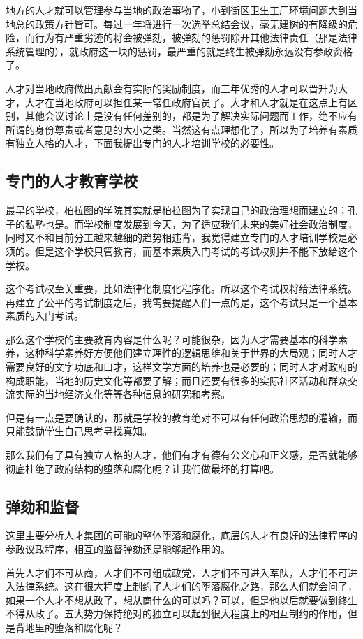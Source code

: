 \documentclass[11pt,oneside]{article}
\begin{document}
地方的人才就可以管理参与当地的政治事物了，小到街区卫生工厂环境问题大到当地总的政策方针皆可。每过一年将进行一次选举总结会议，毫无建树的有降级的危险，而行为有严重劣迹的将会被弹劾，被弹劾的惩罚除开其他法律责任（那是法律系统管理的），就政府这一块的惩罚，最严重的就是终生被弹劾永远没有参政资格了。

人才对当地政府做出贡献会有实际的奖励制度，而三年优秀的人才可以晋升为大才，大才在当地政府可以担任某一常任政府官员了。大才和人才就是在这点上有区别，其他会议讨论上是没有任何差别的，都是为了解决实际问题而工作，绝不应有所谓的身份尊贵或者意见的大小之类。当然这有点理想化了，所以为了培养有素质有独立人格的人才，下面我提出专门的人才培训学校的必要性。

\subsection{专门的人才教育学校}
\label{sec-3-1}
最早的学校，柏拉图的学院其实就是柏拉图为了实现自己的政治理想而建立的；孔子的私塾也是。而学校制度发展到今天，为了适应我们未来的美好社会政治制度，同时又不和目前分工越来越细的趋势相违背，我觉得建立专门的人才培训学校是必须的。但是这个学校只管教育，而基本素质入门考试的考试权则并不能下放给这个学校。

这个考试权至关重要，比如法律化制度化程序化。所以这个考试权将给法律系统。再建立了公平的考试制度之后，我需要提醒人们一点的是，这个考试只是一个基本素质的入门考试。

那么这个学校的主要教育内容是什么呢？可能很杂，因为人才需要基本的科学素养，这种科学素养好方便他们建立理性的逻辑思维和关于世界的大局观；同时人才需要良好的文字功底和口才，这样文学方面的培养也是必要的；同时人才对政府的构成职能，当地的历史文化等都要了解；而且还要有很多的实际社区活动和群众交流实际的当地经济文化等等各种信息的研究和考察。

但是有一点是要确认的，那就是学校的教育绝对不可以有任何政治思想的灌输，而只能鼓励学生自己思考寻找真知。


那么我们有了具有独立人格的人才，他们有才有德有公义心和正义感，是否就能够彻底杜绝了政府结构的堕落和腐化呢？让我们做最坏的打算吧。

\subsection{弹劾和监督}
\label{sec-3-2}
这里主要分析人才集团的可能的整体堕落和腐化，底层的人才有良好的法律程序的参政议政程序，相互的监督弹劾还是能够起作用的。

首先人才们不可从商，人才们不可组成政党，人才们不可进入军队，人才们不可进入法律系统。这在很大程度上制约了人才们的堕落腐化之路，那么人们就会问了，如果一个人才不想从政了，想从商什么的可以吗？可以，但是他以后就要做到终生不得从政了。五大势力保持绝对的独立可以起到很大程度上的相互制约的作用，但是背地里的堕落和腐化呢？
\end{document}
